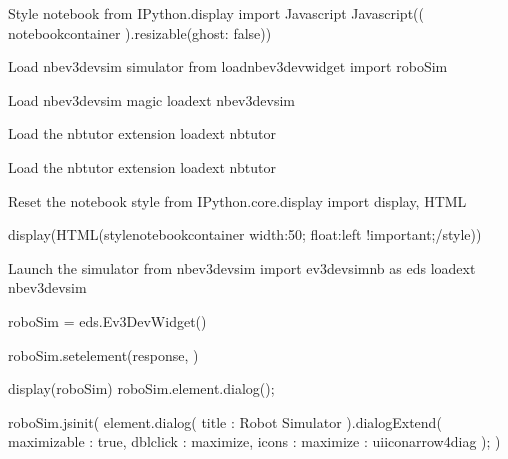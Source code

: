 \documentclass[letterpaper,10pt,english]{sphinxmanual}
\begin{document}
{
\begin{sphinxVerbatim}[commandchars=\\\{\}]
\llap{\color{nbsphinxin}[ ]:\,\hspace{\fboxrule}\hspace{\fboxsep}}\PYGZsh{}Style notebook
from IPython.display import Javascript
Javascript(\PYGZsq{}\PYGZdl{}( \PYGZdq{}\PYGZsh{}notebook\PYGZhy{}container\PYGZdq{} ).resizable(\PYGZob{}ghost: false\PYGZcb{})\PYGZsq{})

\PYGZsh{} Load nbev3devsim simulator
from \PYGZus{}load\PYGZus{}nbev3devwidget import roboSim

\PYGZsh{}Load nbev3devsim magic
\PYGZpc{}load\PYGZus{}ext nbev3devsim

\PYGZsh{}Load the nbtutor extension
\PYGZpc{}load\PYGZus{}ext nbtutor
\end{sphinxVerbatim}
}

{
\begin{sphinxVerbatim}[commandchars=\\\{\}]
\llap{\color{nbsphinxin}[ ]:\,\hspace{\fboxrule}\hspace{\fboxsep}}\PYGZsh{}Load the nbtutor extension
\PYGZpc{}load\PYGZus{}ext nbtutor

\PYGZsh{}Reset the notebook style
from IPython.core.display import display, HTML

display(HTML(\PYGZdq{}\PYGZlt{}style\PYGZgt{}\PYGZsh{}notebook\PYGZhy{}container \PYGZob{} width:50\PYGZpc{}; float:left !important;\PYGZcb{}\PYGZlt{}/style\PYGZgt{}\PYGZdq{}))


\PYGZsh{}Launch the simulator
from nbev3devsim import ev3devsim\PYGZus{}nb as eds
\PYGZpc{}load\PYGZus{}ext nbev3devsim

roboSim = eds.Ev3DevWidget()

roboSim.set\PYGZus{}element(\PYGZdq{}response\PYGZdq{}, \PYGZsq{}\PYGZsq{})

display(roboSim)
roboSim.element.dialog();


roboSim.js\PYGZus{}init(\PYGZdq{}\PYGZdq{}\PYGZdq{}
element.dialog(\PYGZob{} \PYGZdq{}title\PYGZdq{} : \PYGZdq{}Robot Simulator\PYGZdq{} \PYGZcb{}).dialogExtend(\PYGZob{}
        \PYGZdq{}maximizable\PYGZdq{} : true,
        \PYGZdq{}dblclick\PYGZdq{} : \PYGZdq{}maximize\PYGZdq{},
        \PYGZdq{}icons\PYGZdq{} : \PYGZob{} \PYGZdq{}maximize\PYGZdq{} : \PYGZdq{}ui\PYGZhy{}icon\PYGZhy{}arrow\PYGZhy{}4\PYGZhy{}diag\PYGZdq{} \PYGZcb{}\PYGZcb{});
\PYGZdq{}\PYGZdq{}\PYGZdq{})
\end{sphinxVerbatim}
}
\end{document}
